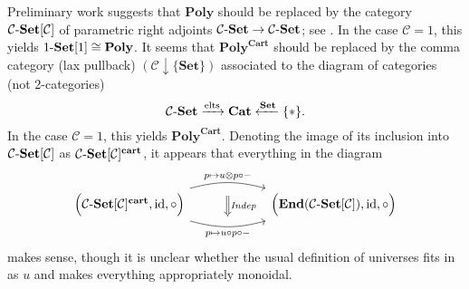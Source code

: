 \documentclass[11pt, one side, article]{memoir}
\theoremstyle{definition}
\theoremstyle{plain}
\newcommand{\cat}[1]{\mathcal{#1}}%
\newcommand{\Cat}[1]{\mathbf{#1}}%
\newcommand{\Fun}[1]{\mathit{#1}}%
\newcommand{\id}{\mathrm{id}}
\newcommand{\To}[2][]{\xrightarrow[#1]{#2}}
\newcommand{\From}[1]{\xleftarrow{#1}}
\newcommand{\tn}[1]{\textnormal{#1}}
\newcommand{\smset}{\Cat{Set}}
\newcommand{\smcat}{\Cat{Cat}}
\newcommand{\en}{\Cat{End}}
\newcommand{\set}{\tn{-}\Cat{Set}}
\newcommand{\poly}{\Cat{Poly}}
\newcommand{\polycart}{\poly^{\Cat{Cart}}}
\newcommand{\0}{\textsf{0}}
\newcommand{\1}{\tn{\textsf{1}}}
\newcommand{\indep}{\Fun{Indep}}
\begin{document}
Preliminary work suggests that $\poly$ should be replaced by the category $\cat{C}\set[\cat{C}]$ of parametric right adjoints $\cat{C}\set\to\cat{C}\set$; see \cite{spivak2021functorial}. In the case $\cat{C}=1$, this yields $1\set[1]\cong\poly$. It seems that $\polycart$ should be replaced by the comma category (lax pullback) $(\cat{C}\downarrow\{\smset\})$ associated to the diagram of categories (not 2-categories)
\[\cat{C}\set\To{\text{elts}}\smcat\From{\smset}\{*\}.\]
In the case $\cat{C}=1$, this yields $\polycart$. Denoting the image of its inclusion into $\cat{C}\set[\cat{C}]$ as $\cat{C}\set[\cat{C}]^{\Cat{cart}}$,  it appears that everything in the diagram
\[
\begin{tikzcd}[column sep=60pt]
	\Big(\cat{C}\set[\cat{C}]^{\Cat{cart}},\id, \circ\Big)
		\ar[r, bend left=15pt,  start anchor={north east}, end anchor={north west}, "p\mapsto u\otimes p\circ-", ""' name=P]
		\ar[r, bend right=15pt, start anchor={south east}, end anchor={south west}, "p\mapsto u\circ p\circ-"', "" name=PP]&
	\Big(\en(\cat{C}\set[\cat{C}]),\id,\circ\Big)
	\ar[from=P, to=P|-PP, Rightarrow, shorten=2mm, "\indep"]
\end{tikzcd}
\]
makes sense, though it is unclear whether the usual definition of universes fits in as $u$ and makes everything appropriately monoidal. 




\printbibliography
\end{document}

